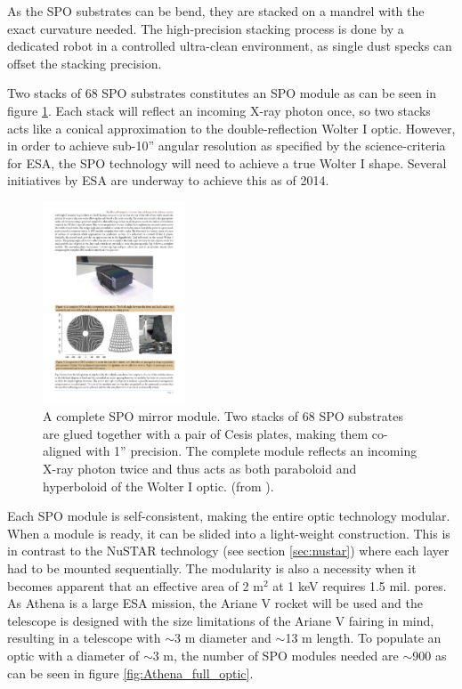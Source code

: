 As the SPO substrates can be bend, they are stacked on a mandrel with the exact curvature needed. The high-precision stacking process is done by a dedicated robot in a controlled ultra-clean environment, as single dust specks can offset the stacking precision.

Two stacks of 68 SPO substrates constitutes an SPO module as can be seen in figure \ref{fig:spo_stack}. Each stack will reflect an incoming X-ray photon once, so two stacks acts like a conical approximation to the double-reflection Wolter I optic. However, in order to achieve sub-10'' angular resolution as specified by the science-criteria for ESA, the SPO technology will need to achieve a true Wolter I shape. Several initiatives by ESA are underway to achieve this as of 2014.

\begin{figure}[!h]
  \center
  \includegraphics[height=6cm]{figures/athena/spo_stack.pdf}
\caption{\footnotesize A complete SPO mirror module. Two stacks of 68 SPO substrates are glued together with a pair of Cesis plates, making them co-aligned with 1'' precision. The complete module reflects an incoming X-ray photon twice and thus acts as both paraboloid and hyperboloid of the Wolter I optic. (from \cite{Willingale:2013vo}).}\label{fig:spo_stack}
\end{figure}

Each SPO module is self-consistent, making the entire optic technology modular. When a module is ready, it can be slided into a light-weight construction. This is in contrast to the NuSTAR technology (see section \ref{sec:nustar}) where each layer had to be mounted sequentially. The modularity is also a necessity when it becomes apparent that an effective area of 2 m$^2$ at 1 keV requires 1.5 mil. pores. As Athena is a large ESA mission, the Ariane V rocket will be used and the telescope is designed with the size limitations of the Ariane V fairing in mind, resulting in a telescope with $\sim$3 m diameter and $\sim$13 m length. To populate an optic with a diameter of $\sim$3 m, the number of SPO modules needed are $\sim$900 as can be seen in figure \ref{fig:Athena_full_optic}.

